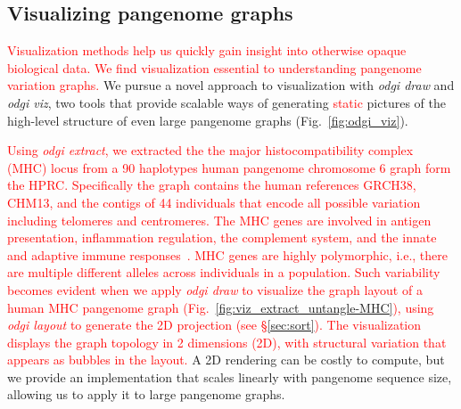 \documentclass{bioinfo}
\newcommand{\REVIEWED}[1]{{\textcolor{Red}{#1}}}
\begin{document}
\subsection{Visualizing pangenome graphs}
\label{sec:viz}


\REVIEWED{Visualization methods help us quickly gain insight into otherwise opaque biological data.
We find visualization essential to understanding pangenome variation graphs.}
We pursue a novel approach to visualization with \textit{odgi draw} and \textit{odgi viz}, two tools that provide scalable ways of generating \REVIEWED{static} pictures of the high-level structure of even large pangenome graphs (Fig.~\ref{fig:odgi_viz}).

\REVIEWED{Using \textit{odgi extract}, we extracted the the major histocompatibility complex (MHC) locus from a 90 haplotypes human pangenome chromosome 6 graph form the HPRC. Specifically the graph contains the human references GRCH38, CHM13, and the contigs of 44 individuals that encode all possible variation including telomeres and centromeres. The MHC genes are involved in antigen presentation, inflammation regulation, the complement system, and the innate and adaptive immune responses~\citep{Shiina2009}.
MHC genes are highly polymorphic, i.e., there are multiple different alleles across individuals in a population.
Such variability becomes evident when we apply \textit{odgi draw} to visualize the graph layout of a human MHC pangenome graph (Fig.~\ref{fig:viz_extract_untangle-MHC}), using \textit{odgi layout} to generate the 2D projection (see \S\ref{sec:sort}).
The visualization displays the graph topology in 2 dimensions (2D), with structural variation that appears as bubbles in the layout.}
A 2D rendering can be costly to compute, but we provide an implementation that scales linearly with pangenome sequence size, allowing us to apply it to large pangenome graphs.
\end{document}
